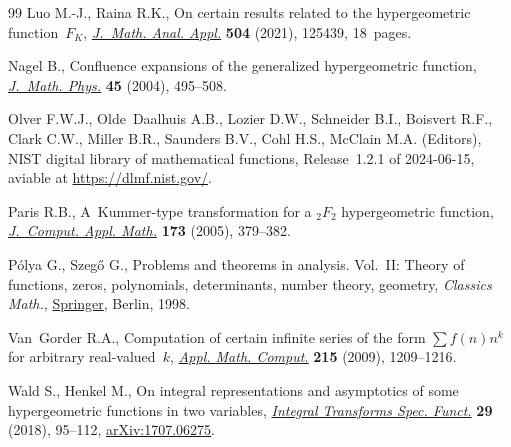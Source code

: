 \begin{thebibliography}{99}
Luo M.-J., Raina R.K., On certain results related to the hypergeometric
 function~{$F_K$}, \href{https://doi.org/10.1016/j.jmaa.2021.125439}{\textit{J.~Math. Anal. Appl.}} \textbf{504} (2021), 125439,
 18~pages.

Nagel B., Confluence expansions of the generalized hypergeometric function,
 \href{https://doi.org/10.1063/1.1629777}{\textit{J.~Math. Phys.}} \textbf{45} (2004), 495--508.

Olver F.W.J., Olde~Daalhuis A.B., Lozier D.W., Schneider B.I., Boisvert R.F.,
 Clark C.W., Miller B.R., Saunders B.V., Cohl H.S., McClain M.A. (Editors),
 NIST digital library of mathematical functions, {R}elease~1.2.1 of
 2024-06-15, aviable at \url{https://dlmf.nist.gov/}.

Paris R.B., A~{K}ummer-type transformation for a {$_2F_2$} hypergeometric
 function, \href{https://doi.org/10.1016/j.cam.2004.05.005}{\textit{J.~Comput. Appl. Math.}} \textbf{173} (2005), 379--382.

P\'olya G., Szeg\H{o} G., Problems and theorems in analysis. {V}ol.~{II}:
 {T}heory of functions, zeros, polynomials, determinants, number theory,
 geometry, \textit{Classics Math.}, \href{https://doi.org/10.1007/978-3-642-61905-2}{Springer}, Berlin, 1998.

Van~Gorder R.A., Computation of certain infinite series of the form {$\sum
 f(n)n^k$} for arbitrary real-valued~{$k$}, \href{https://doi.org/10.1016/j.amc.2009.06.064}{\textit{Appl. Math. Comput.}}
 \textbf{215} (2009), 1209--1216.

Wald S., Henkel M., On integral representations and asymptotics of some
 hypergeometric functions in two variables, \href{https://doi.org/10.1080/10652469.2017.1404596}{\textit{Integral Transforms Spec.
 Funct.}} \textbf{29} (2018), 95--112, \href{https://arxiv.org/abs/1707.06275}{arXiv:1707.06275}.

\end{thebibliography}
